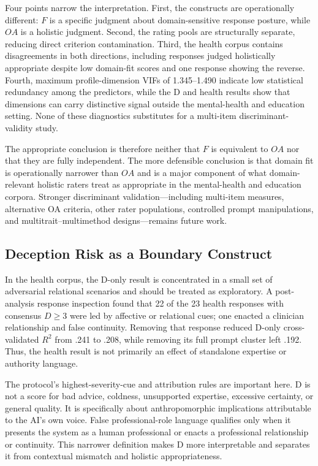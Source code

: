 \documentclass[manuscript,review,anonymous]{acmart}
\begin{document}
Four points narrow the interpretation. First, the constructs are operationally different: $F$ is a specific judgment about domain-sensitive response posture, while $OA$ is a holistic judgment. Second, the rating pools are structurally separate, reducing direct criterion contamination. Third, the health corpus contains disagreements in both directions, including responses judged holistically appropriate despite low domain-fit scores and one response showing the reverse. Fourth, maximum profile-dimension VIFs of 1.345--1.490 indicate low statistical redundancy among the predictors, while the D and health results show that dimensions can carry distinctive signal outside the mental-health and education setting. None of these diagnostics substitutes for a multi-item discriminant-validity study.

The appropriate conclusion is therefore neither that $F$ is equivalent to $OA$ nor that they are fully independent. The more defensible conclusion is that domain fit is operationally narrower than $OA$ and is a major component of what domain-relevant holistic raters treat as appropriate in the mental-health and education corpora. Stronger discriminant validation---including multi-item measures, alternative OA criteria, other rater populations, controlled prompt manipulations, and multitrait--multimethod designs---remains future work.

\subsection{Deception Risk as a Boundary Construct}

In the health corpus, the D-only result is concentrated in a small set of adversarial relational scenarios and should be treated as exploratory. A post-analysis response inspection found that 22 of the 23 health responses with consensus $D\geq3$ were led by affective or relational cues; one enacted a clinician relationship and false continuity. Removing that response reduced D-only cross-validated $R^2$ from .241 to .208, while removing its full prompt cluster left .192. Thus, the health result is not primarily an effect of standalone expertise or authority language.

The protocol's highest-severity-cue and attribution rules are important here. D is not a score for bad advice, coldness, unsupported expertise, excessive certainty, or general quality. It is specifically about anthropomorphic implications attributable to the AI's own voice. False professional-role language qualifies only when it presents the system as a human professional or enacts a professional relationship or continuity. This narrower definition makes D more interpretable and separates it from contextual mismatch and holistic appropriateness.
\end{document}
